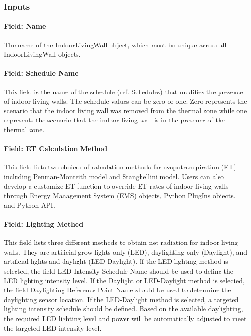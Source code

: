 \subsubsection{Inputs}\label{inputs-indoorlivingwall}

\paragraph{Field: Name}\label{field-name-indoorlivingwall}

The name of the IndoorLivingWall object, which must be unique across all IndoorLivingWall objects.

\paragraph{Field: Schedule Name}\label{field-schedule-name-indoorlivingwall}

This field is the name of the schedule (ref: \hyperref[group-schedules]{Schedules}) that modifies the presence of indoor living walls. The schedule values can be zero or one. Zero represents the scenario that the indoor living wall was removed from the thermal zone while one represents the scenario that the indoor living wall is in the presence of the thermal zone.

\paragraph{Field: ET Calculation Method}\label{field-et-calculation-method-indoorlivingwall}

This field lists two choices of calculation methods for evapotranspiration (ET) including Penman-Monteith model and Stanghellini model. Users can also develop a customize ET function to override ET rates of indoor living walls through Energy Management System (EMS) objects, Python PlugIns objects, and Python API.

\paragraph{Field: Lighting Method}\label{field-lighting-method-indoorlivingwall}

This field lists three different methods to obtain net radiation for indoor living walls. They are artificial grow lights only (LED), daylighting only (Daylight), and artificial lights and daylight (LED-Daylight). If the LED lighting method is selected,  the field LED Intensity Schedule Name should be used to define the LED lighting intensity level. If the Daylight or LED-Daylight method is selected, the field Daylighting Reference Point Name should be used to determine the daylighting sensor location. If the LED-Daylight method is selected, a targeted lighting intensity schedule should be defined. Based on the available daylighting, the required LED lighting level and power will be automatically adjusted to meet the targeted LED intensity level.

